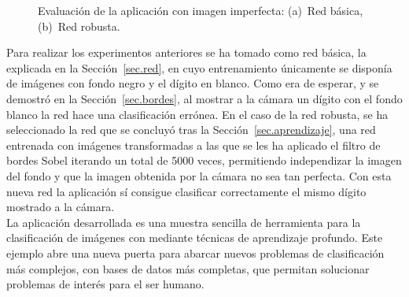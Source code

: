 \begin{figure}[H]
	\centering
	 \hspace{5pt}
	\caption{Evaluación de la aplicación con imagen imperfecta: (a)~Red básica, (b)~Red robusta.}
	\label{fig.experimento}
\end{figure}

Para realizar los experimentos anteriores se ha tomado como red básica, la explicada en la Sección~\ref{sec.red}, en cuyo entrenamiento únicamente se disponía de imágenes con fondo negro y el dígito en blanco. Como era de esperar, y se demostró en la Sección~\ref{sec.bordes}, al mostrar a la cámara un dígito con el fondo blanco la red hace una clasificación errónea. En el caso de la red robusta, se ha seleccionado la red que se concluyó tras la Sección~\ref{sec.aprendizaje}, una red entrenada con imágenes transformadas a las que se les ha aplicado el filtro de bordes Sobel iterando un total de 5000 veces, permitiendo independizar la imagen del fondo y que la imagen obtenida por la cámara no sea tan perfecta. Con esta nueva red la aplicación sí consigue clasificar correctamente el mismo dígito mostrado a la cámara.\\

La aplicación desarrollada es una muestra sencilla de herramienta para la clasificación de imágenes con mediante técnicas de aprendizaje profundo. Este ejemplo abre una nueva puerta para abarcar nuevos problemas de clasificación más complejos, con bases de datos más completas, que permitan solucionar problemas de interés para el ser humano.
